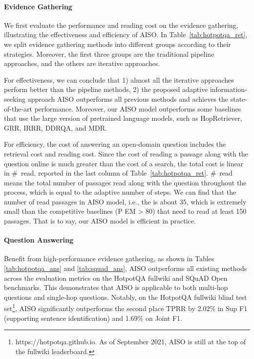 \documentclass[11pt]{article}
\begin{document}
\paragraph{Evidence Gathering}
We first evaluate the performance and reading cost on the evidence gathering, illustrating the effectiveness and efficiency of AISO. 
In Table~\ref{tab:hotpotqa_ret}, we split evidence gathering methods into different groups according to their strategies. 
Moreover, the first three groups are the traditional pipeline approaches, and the others are iterative approaches.

For effectiveness, we can conclude that 1) almost all the iterative approaches perform better than the pipeline methods, 2) the proposed adaptive information-seeking approach AISO outperforms all previous methods and achieves the state-of-the-art performance.
Moreover, our AISO model outperforms some baselines that use the large version of pretrained language models, such as HopRetriever, GRR, IRRR, DDRQA, and MDR.

For efficiency, the cost of answering an open-domain question includes the retrieval cost and reading cost.
Since the cost of reading a passage along with the question online is much greater than the cost of a search, the total cost is linear in \#~read, reported in the last column of Table~\ref{tab:hotpotqa_ret}.
\#~read means the total number of passages read along with the question throughout the process, which is equal to the adaptive number of steps.
We can find that the number of read passages in AISO model, i.e., the  is about 35, which is extremely small than the competitive baselines (P EM > 80) that need to read at least 150 passages. 
That is to say, our AISO model is efficient in practice.

\paragraph{Question Answering}
Benefit from high-performance evidence gathering, as shown in Tables \ref{tab:hotpotqa_ans} and \ref{tab:squad_ans}, AISO outperforms all existing methods across the evaluation metrics on the HotpotQA fullwiki and SQuAD Open benchmarks.
This demonstrates that AISO is applicable to both multi-hop questions and single-hop questions.
Notably, on the HotpotQA fullwiki blind test set\footnote{https://hotpotqa.github.io. As of September 2021, AISO is still at the top of the fullwiki leaderboard.},  AISO significantly outperforms the second place TPRR \citep{TPRR} by 2.02\% in Sup F1 (supporting sentence identification) and 1.69\% on Joint F1.
\end{document}
